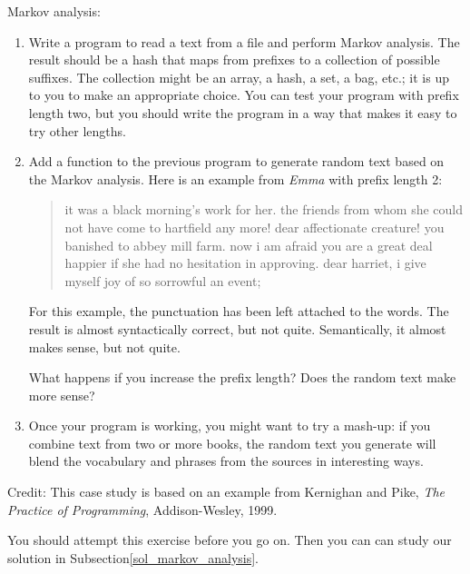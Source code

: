 \begin{exercise}

Markov analysis:
\label{markov_analysis}

\begin{enumerate}

\item Write a program to read a text from a file and perform Markov
analysis.  The result should be a hash that maps from
prefixes to a collection of possible suffixes.  The collection
might be an array, a hash, a set, a bag, etc.; it is up to you 
to make an appropriate choice.  You can test your program with prefix
length two, but you should write the program in a way that makes
it easy to try other lengths.

\item Add a function to the previous program to generate random text
based on the Markov analysis.  Here is an example from {\em Emma}
with prefix length 2:

\begin{quote}
it was a black morning's work for her. the friends from whom 
she could not have come to hartfield any more! dear affectionate 
creature! you banished to abbey mill farm. now i am afraid 
you are a great deal happier if she had no hesitation in 
approving. dear harriet, i give myself joy of so sorrowful an event;
\end{quote}

For this example, the punctuation has been left attached to 
the words. The result is almost syntactically correct, but not 
quite. Semantically, it almost makes sense, but not quite.

What happens if you increase the prefix length?  Does the random
text make more sense?

\item Once your program is working, you might want to try a mash-up:
if you combine text from two or more books, the random
text you generate will blend the vocabulary and phrases from
the sources in interesting ways.

\end{enumerate}

Credit: This case study is based on an example from Kernighan and
Pike, {\em The Practice of Programming}, Addison-Wesley, 1999.

\end{exercise}

You should attempt this exercise before you go on. Then you can can
study our solution in Subsection\ref{sol_markov_analysis}.


